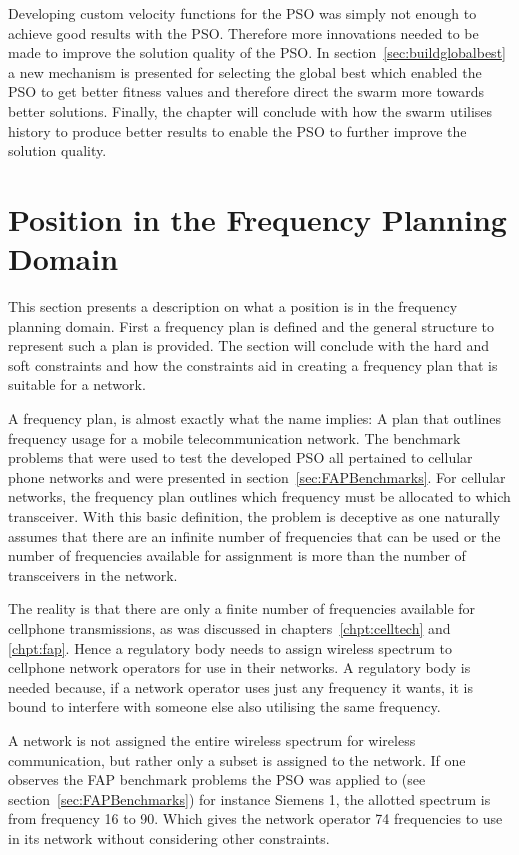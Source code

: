 Developing custom velocity functions for the \gls{PSO} was simply not enough to achieve good results with the \gls{PSO}. Therefore more innovations needed to be made to improve the solution quality of the \gls{PSO}. In section~\ref{sec:buildglobalbest} a new mechanism is presented for selecting the global best which enabled the \gls{PSO} to get better fitness values and therefore direct the swarm more towards better solutions. Finally, the chapter will conclude with how the swarm utilises history to produce better results to enable the \gls{PSO} to further improve the solution quality.
\section{Position in the Frequency Planning Domain}
This section presents a description on what a position is in the frequency planning domain. First a frequency plan is defined and the general structure to represent such a plan is provided. The section will conclude with the hard and soft constraints and how the constraints aid in creating a frequency plan that is suitable for a network.

A frequency plan, is almost exactly what the name implies: A plan that outlines frequency usage for a mobile telecommunication network. The benchmark problems that were used to test the developed \gls{PSO} all pertained to cellular phone networks and were presented in section~\ref{sec:FAPBenchmarks}. For cellular networks, the frequency plan outlines which frequency must be allocated to which transceiver. With this basic definition, the problem is deceptive as one naturally assumes that there are an infinite number of frequencies that can be used or the number of frequencies available for assignment is more than the number of transceivers in the network. 

The reality is that there are only a finite number of frequencies available for cellphone transmissions, as was discussed in chapters~\ref{chpt:celltech} and \ref{chpt:fap}. Hence a regulatory body needs to assign wireless spectrum to cellphone network operators for use in their networks. A regulatory body is needed because, if a network operator uses just any frequency it wants, it is bound to interfere with someone else also utilising the same frequency.

A network is not assigned the entire wireless spectrum for wireless communication, but rather only a subset is assigned to the network. If one observes the \gls{FAP} benchmark problems the \gls{PSO} was applied to (see section~\ref{sec:FAPBenchmarks}) for instance Siemens 1, the allotted spectrum is from frequency 16 to 90. Which gives the network operator 74 frequencies to use in its network without considering other constraints. 

